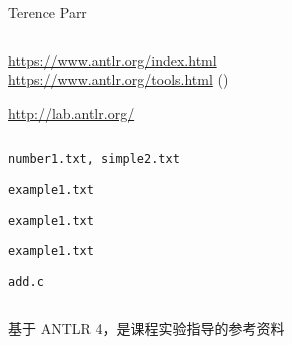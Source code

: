 \begin{frame}{}
  \begin{columns}
    \begin{center}
      Terence Parr
    \end{center}
  \end{columns}

  \vspace{0.80cm}
  \begin{center}
    \url{https://www.antlr.org/index.html} \\[5pt]
    \url{https://www.antlr.org/tools.html} ()
  \end{center}
\end{frame}

\begin{frame}{}
  \begin{center}
    \url{http://lab.antlr.org/}
  \end{center}

  \pause
  \vspace{0.80cm}

  \begin{columns}
    \begin{description}[<+->]
      \setlength{\itemsep}{10pt}
      \item[arithmetic:] \texttt{number1.txt, simple2.txt}
      \item[fol:] \texttt{example1.txt}
      \item[guitartab:] \texttt{example1.txt}
      \item[xyz:] \texttt{example1.txt}
      \item[C:] \texttt{add.c}
    \end{description}
  \end{columns}
\end{frame}

\begin{frame}{}
  \begin{columns}
  \end{columns}

  \vspace{0.50cm}
  \begin{center}
    基于 ANTLR 4，是课程实验指导的参考资料
  \end{center}
\end{frame}

